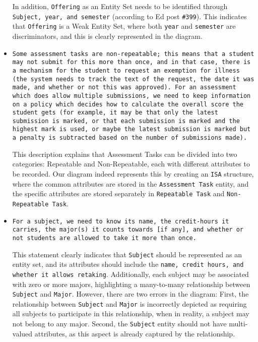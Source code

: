 \documentclass[a4paper,12pt]{article}
\begin{document}
\begin{itemize}
  In addition, \texttt{Offering} as an Entity Set needs to be identified through \texttt{Subject, year, and semester} (according to Ed post \texttt{\#399}). This indicates that \texttt{Offering} is a Weak Entity Set, where both \texttt{year} and \texttt{semester} are discriminators, and this is clearly represented in the diagram.


  \item \texttt{Some assessment tasks are non-repeatable; this means that a student may not submit for this more than once, and in that case, there is a mechanism for the student to request an exemption for illness (the system needs to track the text of the request, the date it was made, and whether or not this was approved). For an assessment which does allow multiple submissions, we need to keep information on a policy which decides how to calculate the overall score the student gets (for example, it may be that only the latest submission is marked, or that each submission is marked and the highest mark is used, or maybe the latest submission is marked but a penalty is subtracted based on the number of submissions made). }

  This description explains that Assessment Tasks can be divided into two categories: Repeatable and Non-Repeatable, each with different attributes to be recorded. Our diagram indeed represents this by creating an \texttt{ISA} structure, where the common attributes are stored in the \texttt{Assessment Task} entity, and the specific attributes are stored separately in \texttt{Repeatable Task} and \texttt{Non-Repeatable Task}.

  \item \texttt{For a subject, we need to know its name, the credit-hours it carries, the major(s) it counts towards [if any], and whether or not students are allowed to take it more than once.}

  This statement clearly indicates that \texttt{Subject} should be represented as an entity set, and its attributes should include the \texttt{name, credit hours, and whether it allows retaking}. Additionally, each subject may be associated with zero or more majors, highlighting a many-to-many relationship between \texttt{Subject} and \texttt{Major}. However, there are two errors in the diagram: First, the relationship between \texttt{Subject} and \texttt{Major} is incorrectly depicted as requiring all subjects to participate in this relationship, when in reality, a subject may not belong to any major. Second, the \texttt{Subject} entity should not have multi-valued attributes, as this aspect is already captured by the relationship.


\end{itemize}
\end{document}
